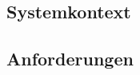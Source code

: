 \subsection{Systemkontext}\label{subsec:systemkontext}


\subsection{Anforderungen}\label{subsec:anforderungen}

